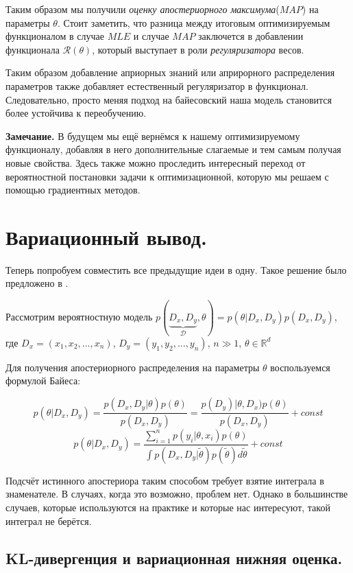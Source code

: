 Таким образом мы получили \textit{оценку апостериорного максимума}($MAP$) на параметры $\theta$. Стоит заметить, что разница между итоговым оптимизируемым функционалом в случае $MLE$ и случае $MAP$ заключется в добавлении функционала $\mathcal{R}(\theta)$,
 который выступает в роли \textit{регуляризатора} весов.

Таким образом добавление априорных знаний или априрорного распределения параметров также добавляет естественный регуляризатор в функционал. Следовательно, просто меняя подход на байесовский наша модель становится более устойчива к переобучению.

\textbf{Замечание.} В будущем мы ещё вернёмся к нашему оптимизируемому функционалу, добавляя в него дополнительные слагаемые и тем самым получая новые свойства.
 Здесь также можно проследить интересный переход от вероятностной постановки задачи к оптимизационной, которую мы решаем с помощью градиентных методов.

\section{Вариационный вывод.}

Теперь попробуем совместить все предыдущие идеи в одну. Такое решение было предложено в \cite{hoffman-SVI}.

Рассмотрим вероятностную модель $p(\underbrace{D_x, D_y}_{\mathcal{D}}, \theta) = p(\theta | D_x, D_y) p(D_x, D_y)$, где $D_x = (x_1, x_2, ..., x_n)$,
 $D_y = (y_1, y_2, ..., y_n)$, $n \gg 1$, $\theta \in \mathbb{R}^d$

Для получения апостериорного распределения на параметры $\theta$ воспользуемся формулой Байеса:

$$p(\theta | D_x, D_y) = \frac{p(D_x, D_y | \theta) p(\theta)}{p(D_x, D_y)} = \frac{p(D_y) | \theta, D_x) p(\theta)}{p(D_x, D_y)} + const$$
$$p(\theta | D_x, D_y) = \frac{\sum_{i=1}^n p(y_i | \theta, x_i) p(\theta)}{\int p(D_x, D_y | \widetilde{\theta})p(\widetilde{\theta}) d\widetilde{\theta}} + const$$

Подсчёт истинного апостериора таким способом требует взятие интеграла в знаменателе. В случаях, когда это возможно, проблем нет. Однако в большинстве случаев, которые используются на практике и которые нас интересуют, такой интеграл не берётся.

\subsection{KL-дивергенция и вариационная нижняя оценка.}

